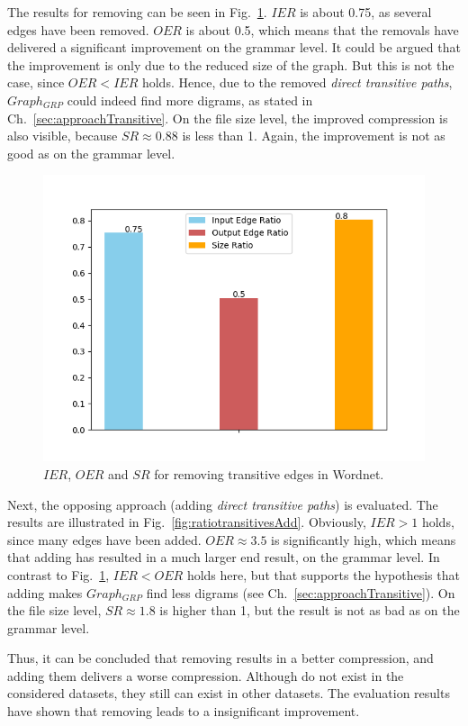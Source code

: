 The results for removing \dtps can be seen in Fig.~\ref{fig:ratiotransitivesDelete}. $IER$ is about 0.75, as several edges have been removed. $OER$ is about 0.5, which means that the removals have delivered a significant improvement on the grammar level. It could be argued that the improvement is only due to the reduced size of the graph. But this is not the case, since $OER<IER$ holds. Hence, due to the removed \textit{direct transitive paths}, $Graph_{GRP}$ could indeed find more digrams, as stated in Ch.~\ref{sec:approachTransitive}. On the file size level, the improved compression is also visible, because $SR\approx0.88$ is less than 1. Again, the improvement is not as good as on the grammar level.

\begin{figure}
	\centering
	\includegraphics[width=0.8\linewidth]{figures/4_evaluation/ontology/ratioTransitivesDelete}
	\caption{$IER$, $OER$ and $SR$ for removing transitive edges in Wordnet.}
	\label{fig:ratiotransitivesDelete}
\end{figure}

Next, the opposing approach (adding \textit{direct transitive paths}) is evaluated. The results are illustrated in Fig.~\ref{fig:ratiotransitivesAdd}. Obviously, $ IER>1 $ holds, since many edges have been added. $OER\approx3.5$ is significantly high, which means that adding \dtps has resulted in a much larger end result, on the grammar level. In contrast to Fig.~\ref{fig:ratiotransitivesDelete}, $IER<OER$ holds here, but that supports the hypothesis that adding \dtps makes $Graph_{GRP}$ find less digrams (see Ch.~\ref{sec:approachTransitive}). On the file size level, $SR\approx1.8$ is higher than 1, but the result is not as bad as on the grammar level. 

Thus, it can be concluded that removing \dtps results in a better compression, and adding them delivers a worse compression. Although \dtps do not exist in the considered datasets, they still can exist in other datasets. The evaluation results have shown that removing \dtps leads to a insignificant improvement. 

